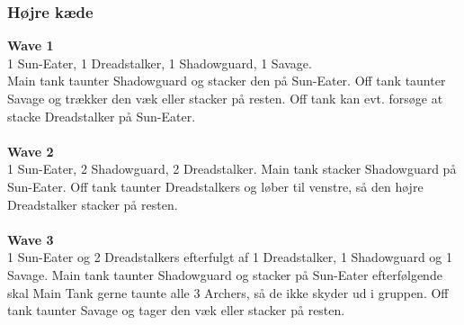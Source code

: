 \subsubsection*{Højre kæde}
\textbf{Wave 1}\\
1 Sun-Eater, 1 Dreadstalker, 1 Shadowguard, 1 Savage.\\
Main tank taunter Shadowguard og stacker den på Sun-Eater. Off tank taunter
Savage og trækker den væk eller stacker på resten. Off tank kan evt. forsøge at
stacke Dreadstalker på Sun-Eater.\\
\\
\textbf{Wave 2}\\
1 Sun-Eater, 2 Shadowguard, 2 Dreadstalker. Main tank stacker Shadowguard på
Sun-Eater. Off tank taunter Dreadstalkers og løber til venstre, så den højre
Dreadstalker stacker på resten.\\
\\
\textbf{Wave 3}\\
1 Sun-Eater og 2 Dreadstalkers efterfulgt af 1 Dreadstalker, 1 Shadowguard og 1
Savage. Main tank taunter Shadowguard og stacker på Sun-Eater efterfølgende
skal Main Tank gerne taunte alle 3 Archers, så de ikke skyder ud i gruppen. 
Off tank taunter Savage og tager den væk eller stacker på resten.


